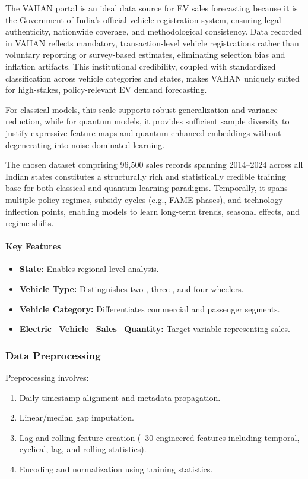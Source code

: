 \documentclass[pdflatex,sn-mathphys-num]{sn-jnl}%
\begin{document}
The VAHAN portal is an ideal data source for EV sales forecasting because it is the Government of India’s official vehicle registration system, ensuring legal authenticity, nationwide coverage, and methodological consistency. Data recorded in VAHAN reflects mandatory, transaction-level vehicle registrations rather than voluntary reporting or survey-based estimates, eliminating selection bias and inflation artifacts. This institutional credibility, coupled with standardized classification across vehicle categories and states, makes VAHAN uniquely suited for high-stakes, policy-relevant EV demand forecasting.

For classical models, this scale supports robust generalization and variance reduction, while for quantum models, it provides sufficient sample diversity to justify expressive feature maps and quantum-enhanced embeddings without degenerating into noise-dominated learning.

The chosen dataset comprising 96,500 sales records spanning 2014–2024 across all Indian states constitutes a structurally rich and statistically credible training base for both classical and quantum learning paradigms. Temporally, it spans multiple policy regimes, subsidy cycles (e.g., FAME phases), and technology inflection points, enabling models to learn long-term trends, seasonal effects, and regime shifts.

\paragraph{Key Features}
\begin{itemize}
    \item \textbf{State:} Enables regional-level analysis.
    \item \textbf{Vehicle Type:} Distinguishes two-, three-, and four-wheelers.
    \item \textbf{Vehicle Category:} Differentiates commercial and passenger segments.
    \item \textbf{Electric\_Vehicle\_Sales\_Quantity:} Target variable representing sales.
\end{itemize}

\subsubsection{Data Preprocessing}

Preprocessing involves:
\begin{enumerate}
    \item Daily timestamp alignment and metadata propagation.
    \item Linear/median gap imputation.
    \item Lag and rolling feature creation (~30 engineered features including temporal, cyclical, lag, and rolling statistics).
    \item Encoding and normalization using training statistics.
\end{enumerate}
\end{document}
